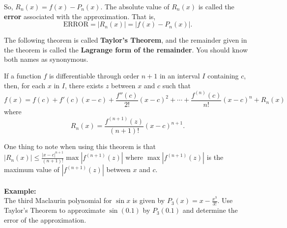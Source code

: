 \documentclass[addpoints, 12pt]{exam}
\begin{document}
\vspace{.2in}

So, $\displaystyle R_n(x)=f(x)-P_n(x)$. The absolute value of $\displaystyle R_n(x)$ is called the \textbf{error} associated with the approximation. That is,
\[\text{ERROR}=|R_n(x)|=|f(x)-P_n(x)|.\]

The following theorem is called \textbf{Taylor's Theorem}, and the remainder given in the theorem is called the \textbf{Lagrange form of the remainder}. You should know both names as synonymous.

\begin{tcolorbox}[title= TAYLOR'S THEOREM,colframe=black,sharp corners,colback=white,colbacktitle=white,coltitle=black]

    If a function $f$ is differentiable through order $n+1$ in an interval $I$ containing $c$, then, for each $x$ in $I$, there exists $z$ between $x$ and $c$ such that
    \[f(x)=f(c)+f'(c)(x-c)+\frac{f''(c)}{2!}(x-c)^2+\cdots+\frac{f^{(n)}(c)}{n!}(x-c)^n+R_n(x)\]
    where
    \[R_n(x)=\frac{f^{(n+1)}(z)}{(n+1)!}(x-c)^{n+1}.\]
    
\end{tcolorbox}
\vspace{.1in}
One thing to note when using this theorem is that $\displaystyle \left|R_n(x)\right|\le\frac{|x-c|^{n+1}}{(n+1)!}\max\left|f^{(n+1)}(z)\right|$ where $\max\left|f^{(n+1)}(z)\right|$ is the maximum value of $\left|f^{(n+1)}(z)\right|$ between $x$ and $c$.\\
\\
\noindent\textbf{Example:}\\
The third Maclaurin polynomial for $\sin x$ is given by $\displaystyle P_3(x)=x-\frac{x^3}{3!}$. Use Taylor's Theorem to approximate $\sin(0.1)$ by $P_3(0.1)$ and determine the error of the approximation.


\newpage
\end{document}
